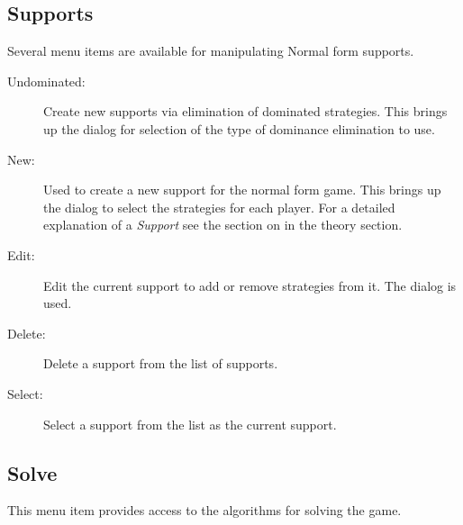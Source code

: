 \subsection{Supports}\label{nfsupports}

Several menu items are available for manipulating Normal form supports.  

\begin{description}
\item[Undominated:] Create new supports via elimination of dominated
strategies.  This brings up the  dialog for selection of the type of
dominance elimination to use.
\item[New:] Used to create a new support for the normal form game.
This brings up the  dialog to select
the strategies for each player.  For a detailed explanation of a {\em
Support} see the section on  in the
theory section.
\item[Edit:] Edit the current support to add or remove strategies from
it. The  dialog is used.  
\item[Delete:] Delete a support from the list of supports.   
\item[Select:] Select a support from the list as the current support.  
\end{description}

\subsection{Solve}\label{nfsolve}

This menu item provides access to the algorithms for solving the game. 

